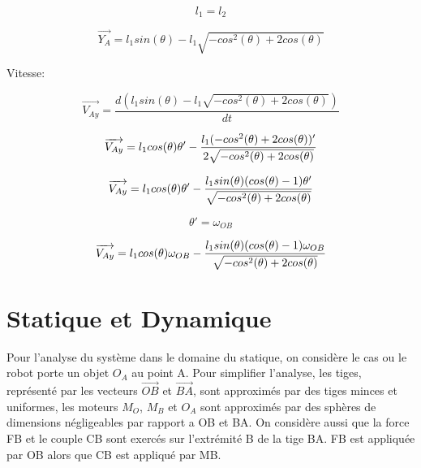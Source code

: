 \documentclass{article}
\begin{document}
\begin{equation}
l_1 = l_2
\end{equation}

\begin{equation}
\overrightarrow{Y_A} = l_1sin(\theta)-l_1\sqrt{-cos^2(\theta)+2cos(\theta)}
\end{equation}

\noindent Vitesse:

\begin{equation}
\overrightarrow{V_{Ay}} = \frac{d(l_1sin(\theta)-l_1\sqrt{-cos^2(\theta)+2cos(\theta)})}{dt}
\end{equation}

\begin{equation}
\overrightarrow{V_{Ay}} = l_1cos(\theta)\theta'-\\
\frac{l_1(-cos^2(\theta)+2cos(\theta))'}{2\sqrt{-cos^2(\theta)+2cos(\theta)}}
\end{equation}

\begin{equation}
\overrightarrow{V_{Ay}} = l_1cos(\theta)\theta'-\\
\frac{l_1sin(\theta)(cos(\theta)-1)\theta'}{\sqrt{-cos^2(\theta)+2cos(\theta)}}
\end{equation}

\begin{equation}
\theta' = \omega_{OB}
\end{equation}

\begin{equation}
\overrightarrow{V_{Ay}} = l_1cos(\theta)\omega_{OB}-\\
\frac{l_1sin(\theta)(cos(\theta)-1)\omega_{OB}}{\sqrt{-cos^2(\theta)+2cos(\theta)}}
\end{equation}

\section{Statique et Dynamique}
\noindent
Pour l'analyse du système dans le domaine du statique, on considère le cas ou le robot porte un objet $O_A$ au point A. Pour simplifier l'analyse, les tiges, représenté par les vecteurs $\overrightarrow{OB}$ et $\overrightarrow{BA}$, sont approximés par des tiges minces et uniformes, les moteurs $M_O$, $M_B$ et $O_A$ sont approximés par des sphères de dimensions négligeables par rapport a OB et BA. On considère aussi que la force FB et le couple CB sont exercés sur l’extrémité B de la tige BA. FB est appliquée par OB alors que CB est appliqué par MB.
\end{document}
